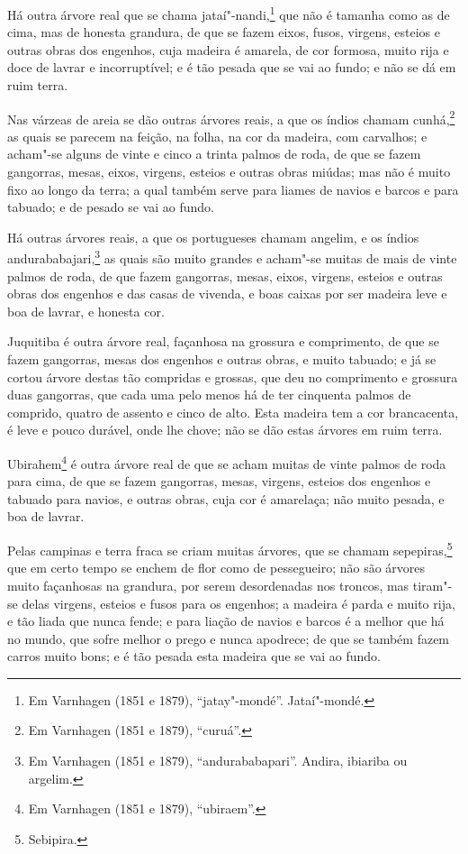 \begin{linenumbers}
Há outra árvore real que se chama jataí"-nandi,\footnote{ Em Varnhagen (1851 e 1879),
``jatay"-mondé''. Jataí"-mondé.} que não é tamanha como as de cima, mas de honesta grandura,
de que se fazem eixos, fusos, virgens, esteios e outras obras dos engenhos, cuja madeira é
amarela, de cor formosa, muito rija e doce de lavrar e incorruptível; e é tão pesada que
se vai ao fundo; e não se dá em ruim terra.

Nas várzeas de areia se dão outras árvores reais, a que os índios chamam cunhá,\footnote{
Em Varnhagen (1851 e 1879), ``curuá''.} as quais se parecem na feição, na folha, na cor da
madeira, com carvalhos; e acham"-se alguns de vinte e cinco a trinta palmos de roda, de que
se fazem gangorras, mesas, eixos, virgens, esteios e outras obras miúdas; mas não é muito
fixo ao longo da terra; a qual também serve para liames de navios e barcos e para tabuado;
e de pesado se vai ao fundo.

Há outras árvores reais, a que os portugueses chamam angelim, e os índios
andurababajari,\footnote{ Em Varnhagen (1851 e 1879), ``andurababapari''. Andira, ibiariba
ou argelim.} as quais são muito grandes e acham"-se muitas de mais de vinte palmos de roda,
de que fazem gangorras, mesas, eixos, virgens, esteios e outras obras dos engenhos e das
casas de vivenda, e boas caixas por ser madeira leve e boa de lavrar, e honesta cor.

Juquitiba é outra árvore real, façanhosa na grossura e comprimento, de que se fazem
gangorras, mesas dos engenhos e outras obras, e muito tabuado; e já se cortou árvore
destas tão compridas e grossas, que deu no comprimento e grossura duas gangorras, que cada
uma pelo menos há de ter cinquenta palmos de comprido, quatro de assento e cinco de alto.
Esta madeira tem a cor brancacenta, é leve e pouco durável, onde lhe chove; não se dão
estas árvores em ruim terra.

Ubirahem\footnote{ Em Varnhagen (1851 e 1879), ``ubiraem''.} é outra árvore real de que se
acham muitas de vinte palmos de roda para cima, de que se fazem gangorras, mesas, virgens,
esteios dos engenhos e tabuado para navios, e outras obras, cuja cor é amarelaça; não
muito pesada, e boa de lavrar.

Pelas campinas e terra fraca se criam muitas árvores, que se chamam sepepiras,\footnote{
Sebipira.} que em certo tempo se enchem de flor como de pessegueiro; não são árvores muito
façanhosas na grandura, por serem desordenadas nos troncos, mas tiram"-se delas virgens,
esteios e fusos para os engenhos; a madeira é parda e muito rija, e tão liada que nunca
fende; e para liação de navios e barcos é a melhor que há no mundo, que sofre melhor o
prego e nunca apodrece; de que se também fazem carros muito bons; e é tão pesada esta
madeira que se vai ao fundo.


\end{linenumbers}
